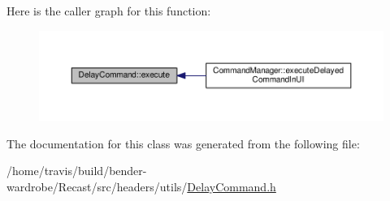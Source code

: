 Here is the caller graph for this function\-:
\nopagebreak
\begin{figure}[H]
\begin{center}
\leavevmode
\includegraphics[width=350pt]{class_delay_command_aab05b5601b95c0de34889a597bb7e4a0_icgraph}
\end{center}
\end{figure}




The documentation for this class was generated from the following file\-:\begin{DoxyCompactItemize}
\item 
/home/travis/build/bender-\/wardrobe/\-Recast/src/headers/utils/\hyperlink{_delay_command_8h}{Delay\-Command.\-h}\end{DoxyCompactItemize}
